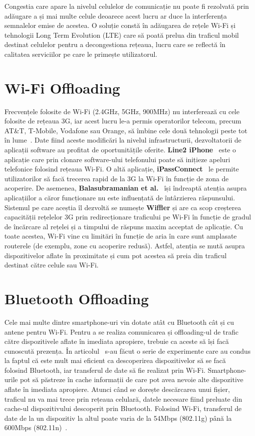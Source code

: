 \documentclass[12pt,a4paper]{report}
\begin{document}
Congestia care apare la nivelul celulelor de comunicație nu poate fi rezolvată prin adăugare a și mai multe celule deoarece acest lucru ar duce la interferența semnalelor emise de acestea. O soluție constă în adăugarea de rețele Wi-Fi și tehnologii Long Term Evolution (LTE) care să poată prelua din traficul mobil destinat celulelor pentru a decongestiona rețeaua, lucru care se reflectă în calitatea serviciilor pe care le primește utilizatorul.

\section{Wi-Fi Offloading}
Frecvențele folosite de Wi-Fi (2.4GHz, 5GHz, 900MHz) nu interferează cu cele folosite de rețeaua 3G, iar acest lucru le-a permis operatorilor telecom, precum AT\&T, T-Mobile, Vodafone sau Orange, să îmbine cele două tehnologii peste tot în lume~\cite{offloading-jou}. Date fiind aceste modificări la nivelul infrastructurii, dezvoltatorii de aplicații software au profitat de oportunitățile oferite. \textbf{Line2 iPhone}~\cite{line2} este o aplicație care prin clonare software-ului telefonului poate să inițieze apeluri telefonice folosind rețeaua Wi-Fi. O altă aplicație, \textbf{iPassConnect}~\cite{ipass} le permite utilizatorilor să facă trecerea rapid de la 3G la Wi-Fi în funcție de zona de acoperire. De asemenea, \textbf{Balasubramanian et al.}~\cite{balasubramanian} își îndreaptă atenția asupra aplicațiilor a căror funcționare nu este influențată de întârzierea răspunsului. Sistemul pe care aceștia îl dezvoltă se numește \textbf{Wiffler} și are ca scop creșterea capacității rețelelor 3G prin redirecționare traficului pe Wi-Fi în funcție de gradul de încărcare al rețelei și a timpului de răspuns maxim acceptat de aplicație.
Cu toate acestea, Wi-Fi vine cu limitări în funcție de aria în care sunt amplasate routerele (de exemplu, zone cu acoperire redusă). Astfel, atenția se mută asupra dispozitivelor aflate în proximitate și cum pot acestea să preia din traficul destinat către celule sau Wi-Fi.

\section{Bluetooth Offloading}
Cele mai multe dintre smartphone-uri vin dotate atât cu Bluetooth cât și cu antene pentru Wi-Fi. Pentru a se realiza comunicarea și offloading-ul de trafic către dispozitivele aflate în imediata apropiere, trebuie ca aceste să își facă cunoscută prezența. În articolul~\cite{offloading-jou} s-au făcut o serie de experimente care au condus la faptul că este mult mai eficient ca descoperirea dispozitivelor să se facă folosind Bluetooth, iar transferul de date să fie realizat prin Wi-Fi. Smartphone-urile pot să păstreze în cache informații de care pot avea nevoie alte dispozitive aflate în imediata apropiere. Atunci când se dorește descărcarea unui fișier, traficul nu va mai trece prin rețeaua celulară, datele necesare fiind preluate din cache-ul dispozitivului descoperit prin Bluetooth. Folosind Wi-Fi, transferul de date de la un dispozitiv la altul poate varia de la 54Mbps (802.11g) până la 600Mbps (802.11n)~\cite{offloading-jou}.
\end{document}
